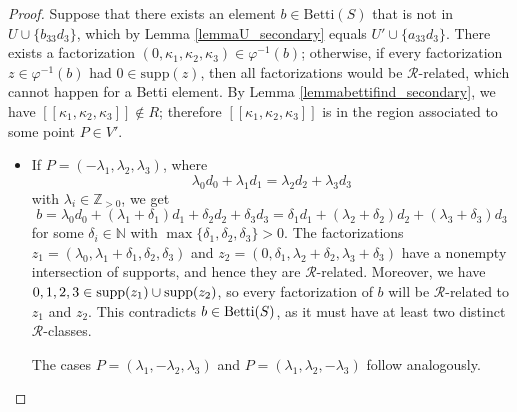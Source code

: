 \documentclass[12pt]{article}
\theoremstyle{remark}
\begin{document}
\begin{proof}
    Suppose that there exists an element $b \in \text{Betti}(S)$ that is not in $U\cup \{b_{33}d_3\}$, which by Lemma \ref{lemmaU_secondary} equals $U' \cup \{a_{33}d_3\}$.
    There exists a factorization $(0,\kappa_1,\kappa_2,\kappa_3) \in \varphi^{-1}(b)$; otherwise, if every factorization $z \in \varphi^{-1}(b)$ had $0 \in \text{supp}(z)$, then all factorizations would be $\mathcal{R}$-related, which cannot happen for a Betti element. By Lemma \ref{lemmabettifind_secondary}, we have $[[\kappa_1,\kappa_2,\kappa_3]] \notin R$; therefore $[[\kappa_1,\kappa_2,\kappa_3]]$ is in the region associated to some point $P \in V'$.  
\begin{itemize}
    \item 
    If $P =(-\lambda_1,\lambda_2,\lambda_3)$, where
    \begin{equation}
        \lambda_0d_0 + \lambda_1d_1 = \lambda_2d_2 + \lambda_3d_3
    \end{equation}
    with $\lambda_i \in \mathbb{Z}_{>0}$, we get
     \begin{equation}
        b =\lambda_0d_0 + (\lambda_1+\delta_1)d_1 + \delta_2d_2 + \delta_3d_3  =  \delta_1d_1 + (\lambda_2+\delta_2)d_2 + (\lambda_3+\delta_3)d_3
    \end{equation}
    for some $\delta_i \in \mathbb{N}$ with $\max \{\delta_1,\delta_2,\delta_3\} > 0$. The factorizations $z_1 =(\lambda_0,\lambda_1+\delta_1,\delta_2,\delta_3)$ and $z_2=(0, \delta_1,\lambda_2+\delta_2,\lambda_3+\delta_3)$ have a nonempty intersection of supports, and hence they are $\mathcal{R}$-related. Moreover, we have $0,1,2,3 \in \textup{supp}(z_1) \cup \textup{supp}(z_2)$, so every factorization of $b$ will be $\mathcal{R}$-related to $z_1$ and $z_2$. This contradicts $b \in \textup{Betti}(S)$, as it must have at least two distinct $\mathcal{R}$-classes. 
    
    The cases $P=(\lambda_1,-\lambda_2,\lambda_3)$ and $P=(\lambda_1,\lambda_2,-\lambda_3)$ follow analogously.
     


\end{itemize}
\end{proof}
\end{document}

